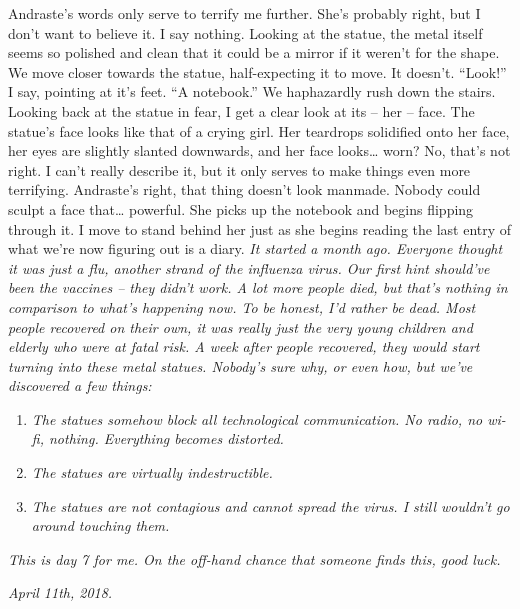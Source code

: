 \documentclass[a4paper, 12pt]{book}
\newcommand\tab[1][1cm]{\hspace*{#1}}
\begin{document}
\newline
\tab
Andraste’s words only serve to terrify me further. She’s probably right, but I don’t want to believe it. I say nothing. Looking at the statue, the metal itself seems so polished and clean that it could be a mirror if it weren’t for the shape.
\newline
\tab
We move closer towards the statue, half-expecting it to move. It doesn’t. “Look!” I say, pointing at it’s feet. “A notebook.” We haphazardly rush down the stairs. Looking back at the statue in fear, I get a clear look at its – her – face. The statue’s face looks like that of a crying girl. Her teardrops solidified onto her face, her eyes are slightly slanted downwards, and her face looks… worn? No, that’s not right. I can’t really describe it, but it only serves to make things even more terrifying. Andraste’s right, that thing doesn’t look manmade. Nobody could sculpt a face that… powerful.
\newline
\tab
She picks up the notebook and begins flipping through it. I move to stand behind her just as she begins reading the last entry of what we’re now figuring out is a diary.
\newline
\tab
\textit{
It started a month ago. Everyone thought it was just a flu, another strand of the influenza virus. Our first hint should’ve been the vaccines – they didn’t work. A lot more people died, but that’s nothing in comparison to what’s happening now. To be honest, I’d rather be dead. Most people recovered on their own, it was really just the very young children and elderly who were at fatal risk. A week after people recovered, they would start turning into these metal statues. Nobody’s sure why, or even how, but we’ve discovered a few things:
}
\begin{enumerate}
\item \textit{The statues somehow block all technological communication. No radio, no wi-fi, nothing. Everything becomes distorted.}
\item \textit{The statues are virtually indestructible.}
\item \textit{The statues are not contagious and cannot spread the virus. I still wouldn’t go around touching them.}
\end{enumerate}
\tab
\textit{This is day 7 for me. On the off-hand chance that someone finds this, good luck.}
\newline
\tab
\begin{center}
\textit{April 11th, 2018.}
\end{center}
\end{document}
